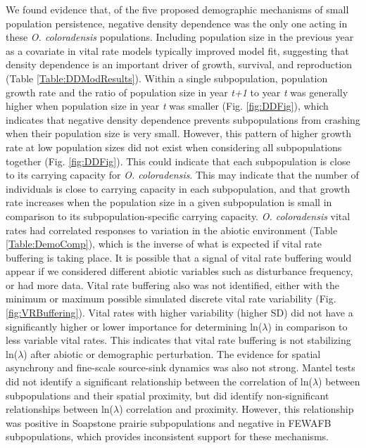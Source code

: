 \documentclass[12pt, letterpaper]{article}
\begin{document}
We found evidence that, of the five proposed demographic mechanisms of small population persistence, negative density dependence was the only one acting in these \textit{O. coloradensis} populations. Including population size in the previous year as a covariate in vital rate models typically improved model fit, suggesting that density dependence is an important driver of growth, survival, and reproduction (Table \ref{Table:DDModResults}). Within a single subpopulation, population growth rate and the ratio of population size in year \textit{t+1} to year \textit{t} was generally higher when population size in year \textit{t} was smaller (Fig. \ref{fig:DDFig}), which indicates that negative density dependence prevents subpopulations from crashing when their population size is very small.  However, this pattern of higher growth rate at low population sizes did not exist when considering all subpopulations together (Fig. \ref{fig:DDFig}). This could indicate that each subpopulation is close to its carrying capacity for \textit{O. coloradensis}. This may indicate that the number of individuals is close to carrying capacity in each subpopulation, and that growth rate increases when the population size in a given subpopulation is small in comparison to its subpopulation-specific carrying capacity. \textit{O. coloradensis} vital rates had correlated responses to variation in the abiotic environment (Table \ref{Table:DemoComp}), which is the inverse of what is expected if vital rate buffering is taking place. It is possible that a signal of vital rate buffering would appear if we considered different abiotic variables such as disturbance frequency, or had more data. Vital rate buffering also was not identified, either with the minimum or maximum possible simulated discrete vital rate variability (Fig. \ref{fig:VRBuffering}). Vital rates with higher variability (higher SD) did not have a significantly higher or lower importance for determining ln($\lambda$) in comparison to less variable vital rates. This indicates that vital rate buffering is not stabilizing ln($\lambda$) after abiotic or demographic perturbation. The evidence for spatial asynchrony and fine-scale source-sink dynamics was also not strong. Mantel tests did not identify a significant relationship between the correlation of ln($\lambda$) between subpopulations and their spatial proximity, but did identify non-significant relationships between ln($\lambda$) correlation and proximity. However, this relationship was positive in Soapstone prairie subpopulations and negative in FEWAFB subpopulations, which provides inconsistent support for these mechanisms.  
\end{document}

